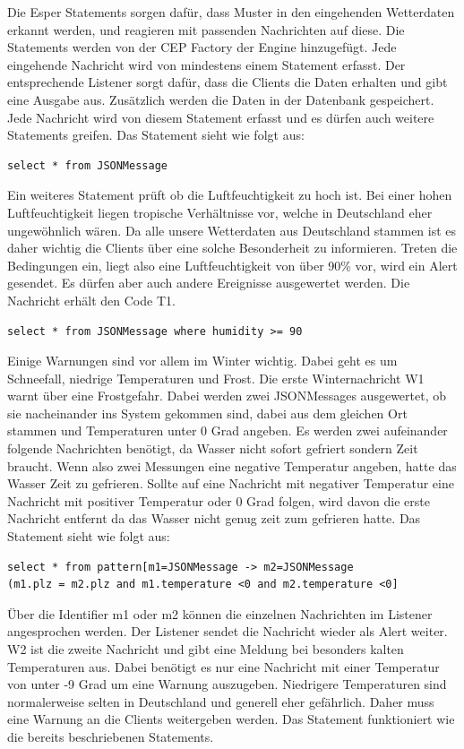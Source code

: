 Die Esper Statements sorgen dafür, dass Muster in den eingehenden Wetterdaten erkannt werden, und reagieren mit passenden Nachrichten auf diese. Die Statements werden von der CEP Factory der Engine hinzugefügt. Jede eingehende Nachricht wird von mindestens einem Statement erfasst. Der entsprechende Listener sorgt dafür, dass die Clients die Daten erhalten und gibt eine Ausgabe aus. Zusätzlich werden die Daten in der Datenbank gespeichert. Jede Nachricht wird von diesem Statement erfasst und es dürfen auch weitere Statements greifen. Das Statement sieht wie folgt aus: 
\begin{lstlisting}
select * from JSONMessage
\end{lstlisting}
Ein weiteres Statement prüft ob die Luftfeuchtigkeit zu hoch ist. Bei einer hohen Luftfeuchtigkeit liegen tropische Verhältnisse vor, welche in Deutschland eher ungewöhnlich wären. Da alle unsere Wetterdaten aus Deutschland stammen ist es daher wichtig die Clients über eine solche Besonderheit zu informieren. Treten die Bedingungen ein, liegt also eine Luftfeuchtigkeit von über 90\% vor, wird ein Alert gesendet. Es dürfen aber auch andere Ereignisse ausgewertet werden.  Die Nachricht erhält den Code T1. 
\begin{lstlisting}
select * from JSONMessage where humidity >= 90
\end{lstlisting}
Einige Warnungen sind vor allem im Winter wichtig. Dabei geht es um Schneefall, niedrige Temperaturen und Frost. Die erste Winternachricht W1 warnt über eine Frostgefahr. Dabei werden zwei JSONMessages ausgewertet, ob sie nacheinander ins System gekommen sind, dabei aus dem gleichen Ort stammen und Temperaturen unter 0 Grad angeben. Es werden zwei aufeinander folgende Nachrichten benötigt, da Wasser nicht sofort gefriert sondern Zeit braucht. Wenn also zwei Messungen eine negative Temperatur angeben, hatte das Wasser Zeit zu gefrieren. Sollte auf eine Nachricht mit negativer Temperatur eine Nachricht mit positiver Temperatur oder 0 Grad folgen, wird davon die erste Nachricht entfernt da das Wasser nicht genug zeit zum gefrieren hatte. Das Statement sieht wie folgt aus: 
\begin{lstlisting}
select * from pattern[m1=JSONMessage -> m2=JSONMessage 
(m1.plz = m2.plz and m1.temperature <0 and m2.temperature <0]
\end{lstlisting}
Über die Identifier m1 oder m2 können die einzelnen Nachrichten im Listener angesprochen werden. Der Listener sendet die Nachricht wieder als Alert weiter. W2 ist die zweite Nachricht und gibt eine Meldung bei besonders kalten Temperaturen aus. Dabei benötigt es nur eine Nachricht mit einer Temperatur von unter -9 Grad um eine Warnung auszugeben. Niedrigere Temperaturen sind normalerweise selten in Deutschland und generell eher gefährlich. Daher muss eine Warnung an die Clients weitergeben werden. Das Statement funktioniert wie die bereits beschriebenen Statements. 
